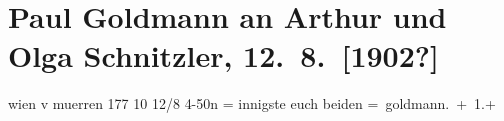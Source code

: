

         
         \renewcommand{\erwaehntePersonen}{Personen: Olga Schnitzler, Heinrich Schnitzler}
         \renewcommand{\erwaehnteOrte}{Orte: Mürren, Wien}
         \renewcommand{\erwaehnteWerke}{}
               \section[Paul Goldmann an Arthur und Olga Schnitzler, 12. 8. {[}1902?{]}]{ Paul Goldmann an Arthur und Olga Schnitzler, 12. 8. {[}1902?{]}}\nopagebreak{}\rehead{ }\begin{ledgroupsized}[t]{13cm}\normalsize\beginnumbering \toendnotes[C]{\smallbreak\pagebreak[2]} 
\toendnotes[C]{\smallbreak}\pstart
           \noindent{}\centering{}{\pb}wien v muerren 177 10 12/8{ }4-50n =\pend
           \pstart
           \noindent{}innigste \label{K_L02636-1v}\label{K_L02636-1h} euch beiden \spacefill\mbox{= goldmann. + 1.+}\pend
           
         
         \endnumbering{}\end{ledgroupsized}  \newcommand{\dateiname}{L02636}\newcommand{\titel}{Paul Goldmann an Arthur und Olga Schnitzler, 12. 8. [1902?]}\newcommand{\editorInnen}{Martin Anton Müller und Laura Untner}
      